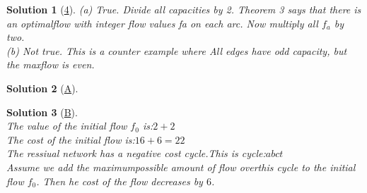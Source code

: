 \documentclass[10pt]{report}
\numberwithin{dummy}{section}
\theoremstyle{ocrenumbox}
\newtheorem{definitionTT}{Solution}[]
\theoremstyle{grayman}
\newenvironment{sol}{\begin{sBox}\begin{definitionTT}}{\end{definitionTT}\end{sBox}}
\begin{document}
\begin{sol}[\hypertarget{sol4}{\hyperlink{exo4}{4}}]
(a) True. Divide all capacities by 2. Theorem 3 says that there is an optimalflow with integer flow values fa on each arc. Now multiply all $f_a$ by two.\\
(b) Not true. This is a counter example where  All edges have odd capacity, but the maxflow is even.
\end{sol}
\begin{sol}[\hypertarget{sola}{\hyperlink{exoa}{A}}]
\phantom{a}\\
\begin{center}
\end{center}
\end{sol}
\begin{sol}[\hypertarget{solb}{\hyperlink{exob}{B}}]\phantom{a}\\
The value of the initial flow $f_0$ is:$2+2$ \\
The cost of the initial flow is:$16+6=22$ \\
The ressiual network has a negative cost cycle.This is cycle:$abct$\\
Assume we add the maximumpossible amount of flow overthis cycle to the initial flow $f_0$. Then he cost of the flow decreases by $6$.
\end{sol}
\end{document}
